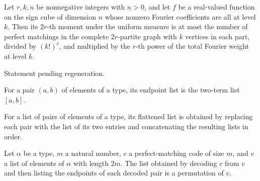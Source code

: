 \begin{theorem}
\label{FABL.homogeneous_evenMoment_le_graphMatching_count}
\leanok
{}
Let $r,k,n$ be nonnegative integers with $n>0$, and let $f$ be a real-valued function on
the sign cube of dimension $n$ whose nonzero Fourier coefficients are all at level $k$.
Then its $2r$-th moment under the uniform measure is at most the number of perfect
matchings in the complete $2r$-partite graph with $k$ vertices in each part, divided by
$(k!)^r$, and multiplied by the $r$-th power of the total Fourier weight at level $k$.
\end{theorem}

\begin{theorem}
\label{FABL.proof_heq}
\leanok
Statement pending regeneration.
\end{theorem}

\begin{definition}
\label{FABL.pairEndpoints}
\leanok
For a pair $(a,b)$ of elements of a type, its endpoint list is the two-term list
$[a,b]$.
\end{definition}

\begin{definition}
\label{FABL.flattenPairList}
\leanok
{}
For a list of pairs of elements of a type, its flattened list is obtained by replacing
each pair with the list of its two entries and concatenating the resulting lists in
order.
\end{definition}

\begin{theorem}
\label{FABL.flattenPairList_decodePerfectMatchingCode_perm}
\leanok
{}
Let $\alpha$ be a type, $m$ a natural number, $c$ a perfect-matching code of size $m$,
and $v$ a list of elements of $\alpha$ with length $2m$. The list obtained by decoding
$c$ from $v$ and then listing the endpoints of each decoded pair is a permutation of
$v$.
\end{theorem}


